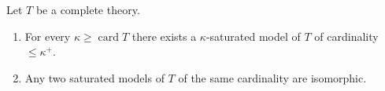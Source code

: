 Let $T$ be a complete theory.

\begin{enumerate}
\item[(i)] For every $\kappa \geq \operatorname{card} T$ there exists a $\kappa$-saturated model of $T$ of cardinality $\leq \kappa^+$.

\item[(ii)] Any two saturated models of $T$ of the same cardinality are isomorphic.
\end{enumerate}
